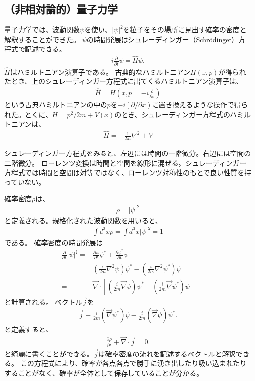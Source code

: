 \documentclass[10pt,a4paper]{jarticle}
\begin{document}
\subsection{（非相対論的）量子力学}
量子力学では、波動関数$\psi$を使い、$|\psi|^2$を粒子をその場所に見出す確率の密度と解釈することができた。
$\psi$の時間発展はシュレーディンガー（Schr\"odinger）方程式で記述できる。
\begin{align}
i\frac{\partial}{\partial t} \psi = {\hat H} \psi.
\end{align}
$\hat H$はハミルトニアン演算子である。
古典的なハミルトニアン$H(x,p)$が得られたとき、上のシュレーディンガー方程式に出てくるハミルトニアン演算子は、
\begin{align}
\hat H = H\left( x, p= -i\frac{\partial}{\partial x} \right)
\end{align}
という古典ハミルトニアンの中の$p$を$-i(\partial/\partial x)$に置き換えるような操作で得られた。とくに、$H = p^2/2m + V(x)$のとき、シュレーディンガー方程式のハミルトニアンは、
\begin{align}
\hat H = -\frac{1}{2m}\nabla^2 + V
\end{align}

シュレーディンガー方程式をみると、左辺には時間の一階微分。右辺には空間の二階微分。
ローレンツ変換は時間と空間を線形に混ぜる。シュレーディンガー方程式では時間と空間は対等ではなく、ローレンツ対称性のもとで良い性質を持っていない。


確率密度$\rho$は、
\begin{align}
\rho = |\psi|^2 \label{eq:probability density NR}
\end{align}
と定義される。規格化された波動関数を用いると、
\begin{align}
\int d^3x \rho = \int d^3x |\psi|^2 = 1
\end{align}
である。
確率密度の時間発展は
\begin{align}
\frac{\partial}{\partial t}|\psi|^2
=& \frac{\partial \psi}{\partial t} \psi^* + \frac{\partial \psi^*}{\partial t} \psi \nonumber\\
=& \left( \frac{i}{2m} \nabla^2 \psi \right) \psi^* - \left( \frac{i}{2m} \nabla^2 \psi^* \right) \psi \nonumber\\
=& \vec\nabla \cdot \left[ \left( \frac{i}{2m} \vec\nabla \psi \right) \psi^* - \left( \frac{i}{2m} \vec\nabla \psi^* \right) \psi \right]
\end{align}
と計算される。
ベクトル$\vec j$を
\begin{align}
\vec j \equiv \frac{i}{2m} (\vec\nabla\psi^*) \psi - \frac{i}{2m} (\vec\nabla\psi) \psi^*.
\end{align}
と定義すると、
\begin{align}
\frac{\partial\rho}{\partial t} + \vec \nabla \cdot \vec j = 0.
\end{align}
と綺麗に書くことができる。$\vec j$は確率密度の流れを記述するベクトルと解釈できる。
この方程式により、確率が各点各点で勝手に湧き出したり吸い込まれたりすることがなく、確率が全体として保存していることが分かる。
\end{document}
